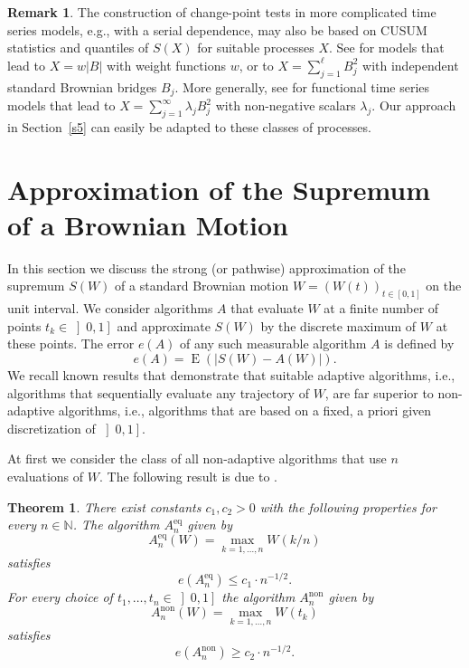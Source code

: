 \documentclass[a4paper]{amsart}
\theoremstyle{definition}
\newtheorem{rem}[exmp]{Remark}
\theoremstyle{plain}
\newtheorem{thm}[exmp]{Theorem}
\newcommand{\N}{\mathbb N}
\newcommand{\E}{\operatorname{E}}
\newcommand{\equi}{\ensuremath{ \mathrm{eq} }}
\newcommand{\non}{\ensuremath{ \mathrm{non} }}
\begin{document}
\begin{rem}\label{r3}
The construction of change-point tests in more complicated time
series models,
e.g., with a serial dependence, may also be based on CUSUM
statistics and quantiles of $S(X)$ for suitable processes $X$.
See \citet*{AueHorvath13} for models that lead
to $X=w |B|$ with weight functions $w$,
or to $X = \sum_{j=1}^\ell B_j^2$ with independent standard Brownian
bridges $B_j$.
More generally, see \citet*{Aue_et_al_2018} for functional time
series models that lead to $X=\sum_{j=1}^\infty \lambda_j B_j^2$ with
non-negative scalars $\lambda_j$.
Our approach in Section~\ref{s5} can easily be adapted to these
classes of processes.
\end{rem}

\section{Approximation of the Supremum of a Brownian Motion}%
\label{poweradap}

In this section we discuss the strong (or pathwise)
approximation of the supremum $S(W)$
of a standard Brownian motion $W=(W(t))_{t\in [0,1]}$ on the unit
interval. We consider algorithms $A$ that evaluate $W$ at a finite
number of points $t_{k} \in \left]0,1\right]$ and
approximate $S(W)$ by the
discrete maximum of $W$ at these points. The error $e(A)$ of any such
measurable algorithm $A$ is defined by
\[
e(A) = \E \left(|S(W) - A(W)|\right).
\]
We recall known results that demonstrate that
suitable adaptive algorithms, i.e., algorithms that sequentially
evaluate any trajectory of $W$, are far superior to non-adaptive
algorithms, i.e., algorithms that are based on a
fixed, a priori given discretization of $\left]0,1\right]$.

At first we consider the class of all non-adaptive algorithms that use $n$
evaluations of $W$. The following result is due to \citet*{MR1085383}.

\begin{thm}\label{t3}
There exist constants $c_1,c_2 > 0$ with the following properties
for every $n \in \N$.
The algorithm $A_n^\equi$ given by
\[
A_n^\equi (W) = \max_{k=1,\dots,n} W(k/n)
\]
satisfies
\begin{equation}\label{g1}
e(A_n^\equi) \leq c_1 \cdot n^{-1/2}.
\end{equation}
For every choice of $t_1, \dots, t_n \in
\left]0,1\right]$ the algorithm $A^\non_n$ given by
\[
A^\non_n(W) = \max_{k=1,\dots,n} W(t_{k})
\]
satisfies
\begin{equation}\label{g2}
e(A^\non_n) \geq c_2 \cdot n^{-1/2}.
\end{equation}
\end{thm}
\end{document}
